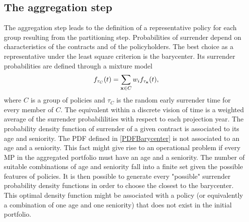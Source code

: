 \subsection{The aggregation step}
The aggregation step leads to the definition of a representative policy for each group resulting from the partitioning step. Probabilities of surrender depend on characteristics of the contracts and of the policyholders. The best choice as a representative under the least square criterion is the barycenter. Its surrender probabilities are defined through a mixture model
\begin{equation}\label{PDFBarycenter}
f_{\tau_{C}}(t)=\sum_{\bold{x}\in C}w_{i}f_{\tau_{\bold{x}}}(t),
\end{equation} 
where $C$ is a group of policies and $\tau_{C}$ is the random early surrender time for every member of $C$. The equivalent within a discrete vision of time is a weighted average of the surrender probabililities with respect to each projection year. The probability density function of surrender of a given contract is associated to its age and seniority. The PDF defined in \eqref{PDFBarycenter} is not associated to an age and a seniority. This fact might give rise to an operational problem if every MP in the aggregated portfolio must have an age and a seniority. The number of suitable combinations of age and seniority fall into a finite set given the possible features of policies. It is then possible to generate every "possible" surrender probability density functions in order to choose the closest to the barycenter. This optimal density function might be associated with a policy (or equivalently a combination of one age and one seniority) that does not exist in the initial portfolio.
